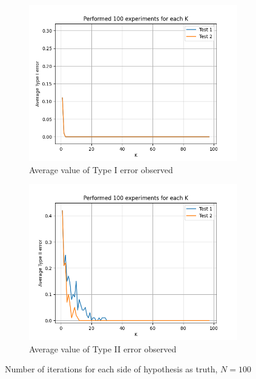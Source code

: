 \documentclass[fleqn, 11pt]{article}
\begin{document}
\newpage
\begin{figure}[H]
    \centering
    \begin{subfigure}[H]{0.49\textwidth}
        \centering
        \includegraphics[width=\textwidth]{P3/type1_100.png}
        \caption[]{Average value of Type I error observed}
    \end{subfigure}
    \begin{subfigure}[H]{0.49\textwidth}
        \centering
        \includegraphics[width=\textwidth]{P3/type2_100.png}
        \caption[]{Average value of Type II error observed}
    \end{subfigure}
    \caption{Number of iterations for each side of hypothesis as truth, $N = 100$}
\end{figure}
\end{document}
